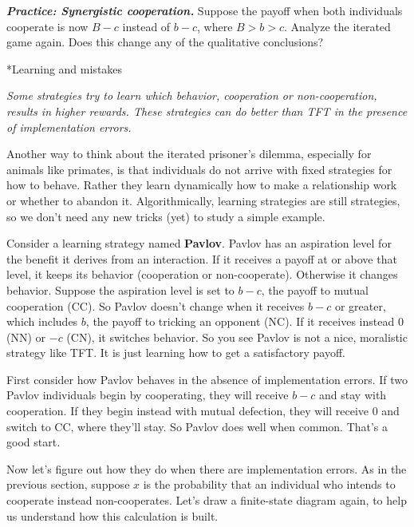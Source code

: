 \documentclass[10pt,reqno]{amsbook}
\makeatletter
\newcommand{\bemph}[1]{{\textbf{\textcolor{bemphcol}{#1}}}}
\renewcommand\section{\@startsection{section}{1}
\z@{.7\linespacing\@plus\linespacing}{.5\linespacing}
{\large\bfseries\itshape}}
\numberwithin{equation}{chapter}
\newenvironment{mathboxmp}[1]
{\begin{tcolorbox}[breakable, enhanced, oversize]\footnotesize\noindent\textbf{\emph{#1}}}
{\end{tcolorbox}}
\newenvironment{precis}
{\noi\itshape}
{\vspace{6pt}}
\newcommand{\noi}{\noindent}
\makeatother
\begin{document}
\begin{mathboxmp}{Practice: Synergistic cooperation.}
Suppose the payoff when both individuals cooperate is now $B-c$ instead of $b-c$, where $B>b>c$. Analyze the iterated game again. Does this change any of the qualitative conclusions?
\end{mathboxmp}

\section*{Learning and mistakes}

\begin{precis}Some strategies try to learn which behavior, cooperation or non-cooperation, results in higher rewards. These strategies can do better than TFT in the presence of implementation errors.\end{precis}

Another way to think about the iterated prisoner's dilemma, especially for animals like primates, is that individuals do not arrive with fixed strategies for how to behave. Rather they learn dynamically how to make a relationship work or whether to abandon it. Algorithmically, learning strategies are still strategies, so we don't need any new tricks (yet) to study a simple example.

Consider a learning strategy named \bemph{Pavlov}. Pavlov has an aspiration level for the benefit it derives from an interaction. If it receives a payoff at or above that level, it keeps its behavior (cooperation or non-cooperate). Otherwise it changes behavior. Suppose the aspiration level is set to $b-c$, the payoff to mutual cooperation (CC). So Pavlov doesn't change when it receives $b-c$  or greater, which includes $b$, the payoff to tricking an opponent (NC). If it receives instead $0$ (NN) or $-c$ (CN), it switches behavior. So you see Pavlov is not a nice, moralistic strategy like TFT. It is just learning how to get a satisfactory payoff. 

First consider how Pavlov behaves in the absence of implementation errors. If two Pavlov individuals begin by cooperating, they will receive $b-c$ and stay with cooperation. If they begin instead with mutual defection, they will receive $0$ and switch to CC, where they'll stay. So Pavlov does well when common. That's a good start.

Now let's figure out how they do when there are implementation errors. As in the previous section, suppose $x$ is the probability that an individual who intends to cooperate instead non-cooperates. Let's draw a finite-state diagram again, to help us understand how this calculation is built.
\end{document}
